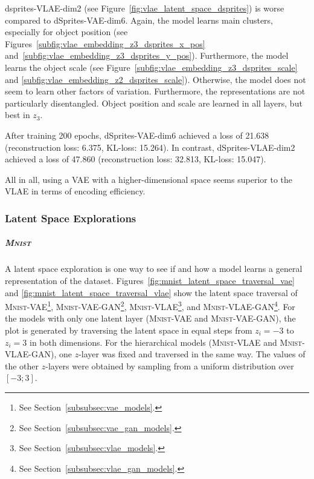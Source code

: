 dsprites-\ac{VLAE}-dim2 (see Figure~\ref{fig:vlae_latent_space_dsprites}) is worse compared to dSprites-\ac{VAE}-dim6.
Again, the model learns main clusters, especially for object position (see Figures~\ref{subfig:vlae_embedding_z3_dsprites_x_pos} and~\ref{subfig:vlae_embedding_z3_dsprites_y_pos}).
Furthermore, the model learns the object scale (see Figure~\ref{subfig:vlae_embedding_z3_dsprites_scale} and \ref{subfig:vlae_embedding_z2_dsprites_scale}).
Otherwise, the model does not seem to learn other factors of variation.
Furthermore, the representations are not particularly disentangled.
Object position and scale are learned in all layers, but best in $z_3$.

After training 200 epochs, dSprites-\ac{VAE}-dim6 achieved a loss of 21.638 (reconstruction loss: 6.375, \ac{KL}-loss: 15.264).
In contrast, dSprites-\ac{VLAE}-dim2 achieved a loss of 47.860 (reconstruction loss: 32.813, \ac{KL}-loss: 15.047).

All in all, using a \ac{VAE} with a higher-dimensional space seems superior to the \ac{VLAE} in terms of encoding efficiency.

\subsubsection{Latent Space Explorations}\label{subsubsec:latent_space_traversals}

\subparagraph{\textsc{Mnist}}

A latent space exploration is one way to see if and how a model learns a general representation of the dataset.
Figures~\ref{fig:mnist_latent_space_traversal_vae} and \ref{fig:mnist_latent_space_traversal_vlae} show the latent space traversal of \textsc{Mnist}-\ac{VAE}\footnote{See Section~\ref{subsubsec:vae_models}.}, \textsc{Mnist}-\ac{VAE}-\ac{GAN}\footnote{See Section~\ref{subsubsec:vae_gan_models}.}, \textsc{Mnist}-\ac{VLAE}\footnote{See Section~\ref{subsubsec:vlae_models}.}, and \textsc{Mnist}-\ac{VLAE}-\ac{GAN}\footnote{See Section~\ref{subsubsec:vlae_gan_models}.}.
For the models with only one latent layer (\textsc{Mnist}-\ac{VAE} and \textsc{Mnist}-\ac{VAE}-\ac{GAN}), the plot is generated by traversing the latent space in equal steps from $z_i = -3$ to $z_i = 3$ in both dimensions.
For the hierarchical models (\textsc{Mnist}-\ac{VLAE} and \textsc{Mnist}-\ac{VLAE}-\ac{GAN}), one $z$-layer was fixed and traversed in the same way.
The values of the other $z$-layers were obtained by sampling from a uniform distribution over $[-3; 3]$.

